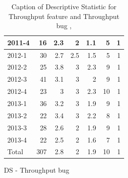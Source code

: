 \documentclass[UKenglish]{ifimaster}  %
\begin{document}
\begin{appendices}
\begin{table}[!htbp]
\begin{adjustwidth}{-2.5cm}{}
\begin{subfigure}[b]{0.3\textwidth}
{\begin{tabular}{ | l | r | r | r | r | r | r | }
 2011-4  & 16 & 2.3 & 2 & 1.1 & 5 & 1 \\ \hline
 2012-1  & 30 & 2.7 & 2.5 & 1.5 & 5 & 1 \\ \hline
 2012-2  & 25 & 3.8 & 3 & 2.3 & 9 & 1 \\ \hline
 2012-3  & 41 & 3.1 & 3 & 2 & 9 & 1 \\ \hline
 2012-4  & 23 & 3 & 3 & 2.3 & 10 & 1 \\ \hline
 2013-1  & 36 & 3.2 & 3 & 1.9 & 9 & 1 \\ \hline
 2013-2  & 22 & 3.4 & 3 & 2.2 & 8 & 1 \\ \hline
 2013-3  & 28 & 2.6 & 2 & 1.9 & 9 & 1 \\ \hline
 2013-4  & 22 & 2.5 & 2 & 1.6 & 7 & 1 \\ \hline
 Total  & 307 & 2.8 & 2 & 1.9 & 10 & 1 \\ \hline
\end{tabular}
}
\caption{DS - Throughput bug}
 \label{DS:TPB:9}
\end{subfigure}
\end{adjustwidth}
\caption[Optional caption for list of figures]{Caption of Descriptive Statistic for Throughput feature and Throughput bug  , }
\label{DS:9:2}
\end{table}




\end{appendices}
\end{document}
